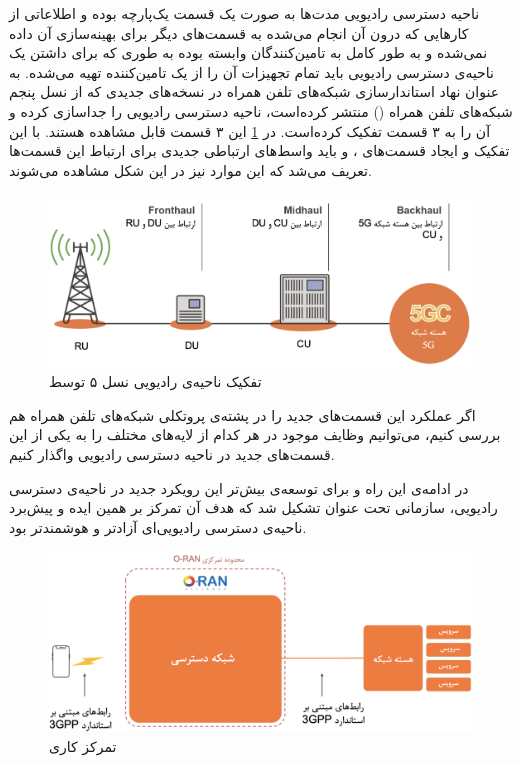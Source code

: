 \documentclass{CSICC}
\begin{document}
ناحیه دسترسی رادیویی مدت‌ها به صورت یک قسمت یک‌پارچه بوده و اطلاعاتی از کارهایی که درون آن انجام می‌شده به قسمت‌های دیگر برای بهینه‌سازی آن داده نمی‌شده و به طور کامل به تامین‌کنندگان وابسته بوده به طوری که برای داشتن یک ناحیه‌ی دسترسی رادیویی باید تمام تجهیزات آن را از یک تامین‌کننده تهیه می‌شده. 
به عنوان نهاد استاندارسازی شبکه‌های تلفن همراه در نسخه‌های جدیدی که از نسل پنجم شبکه‌های تلفن همراه 
()
منتشر کرده‌است، ناحیه دسترسی رادیویی را جداسازی 
کرده و آن را به ۳ قسمت تفکیک کرده‌است. در 
\ref{fig:3gpp-ran}
این ۳ قسمت قابل مشاهده‌ هستند. با این تفکیک و ایجاد قسمت‌های 
،
و 
باید واسط‌های ارتباطی جدیدی برای ارتباط این قسمت‌ها تعریف می‌شد که این موارد نیز در این شکل مشاهده می‌شوند.
\begin{figure}
	\includegraphics[width=\columnwidth]{Images/3gpp-ran.png}
	\centering
	\caption{تفکیک ناحیه‌ی رادیویی نسل ۵ توسط
		}
	\label{fig:3gpp-ran}
\end{figure}

اگر عملکرد این قسمت‌های جدید را در پشته‌ی پروتکلی 
شبکه‌های تلفن همراه هم بررسی کنیم، می‌توانیم وظایف موجود در هر کدام از لایه‌های مختلف را به یکی از این قسمت‌های جدید در ناحیه دسترسی رادیویی واگذار کنیم.

در ادامه‌ی این راه و برای توسعه‌ی بیش‌تر این رویکرد جدید در ناحیه‌ی دسترسی رادیویی، سازمانی تحت عنوان
تشکیل شد که هدف آن تمرکز بر همین ایده و پیش‌برد ناحیه‌ی دسترسی رادیویی‌ای آزادتر و هوشمندتر بود.

\begin{figure}[H]
	\includegraphics[width=\columnwidth]{Images/alliance.png}
	\centering
	\caption{تمرکز کاری
		}
	\label{fig:alliance}
\end{figure}
\end{document}
